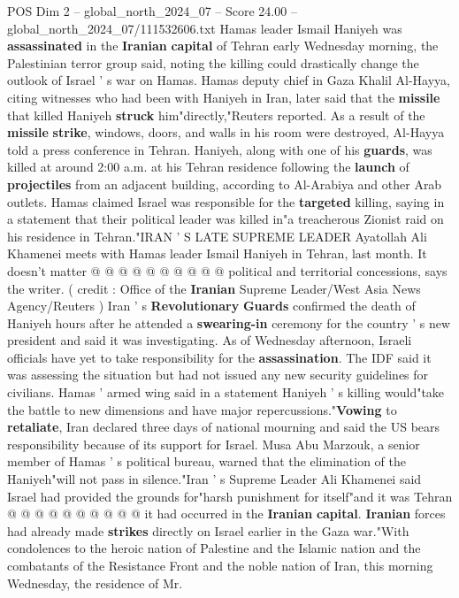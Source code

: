 \begin{textsample}{POS Dim 2 – global\_north\_2024\_07 – Score 24.00 – global\_north\_2024\_07/111532606.txt}  \label{ex:f2_pos_187}
Hamas leader Ismail Haniyeh was \textbf{assassinated} in the \textbf{Iranian} \textbf{capital} of Tehran early Wednesday morning, the Palestinian terror group said, noting the killing could drastically change the outlook of Israel ' s war on Hamas.
Hamas deputy chief in Gaza Khalil Al-Hayya, citing witnesses who had been with Haniyeh in Iran, later said that the \textbf{missile} that killed Haniyeh \textbf{struck} him"directly,"Reuters reported.
As a result of the \textbf{missile} \textbf{strike}, windows, doors, and walls in his room were destroyed, Al-Hayya told a press conference in Tehran.
Haniyeh, along with one of his \textbf{guards}, was killed at around 2:00 a.m. at his Tehran residence following the \textbf{launch} of \textbf{projectiles} from an adjacent building, according to Al-Arabiya and other Arab outlets.
Hamas claimed Israel was responsible for the \textbf{targeted} killing, saying in a statement that their political leader was killed in"a treacherous Zionist raid on his residence in Tehran."IRAN ' S LATE SUPREME LEADER Ayatollah Ali Khamenei meets with Hamas leader Ismail Haniyeh in Tehran, last month.
It doesn't matter @ @ @ @ @ @ @ @ @ @ political and territorial concessions, says the writer. ( credit : Office of the \textbf{Iranian} Supreme Leader/West Asia News Agency/Reuters ) Iran ' s \textbf{Revolutionary} \textbf{Guards} confirmed the death of Haniyeh hours after he attended a \textbf{swearing-in} ceremony for the country ' s new president and said it was investigating.
As of Wednesday afternoon, Israeli officials have yet to take responsibility for the \textbf{assassination}.
The IDF said it was assessing the situation but had not issued any new security guidelines for civilians.
Hamas ' armed wing said in a statement Haniyeh ' s killing would"take the battle to new dimensions and have major repercussions."\textbf{Vowing} to \textbf{retaliate}, Iran declared three days of national mourning and said the US bears responsibility because of its support for Israel.
Musa Abu Marzouk, a senior member of Hamas ' s political bureau, warned that the elimination of the Haniyeh"will not pass in silence."Iran ' s Supreme Leader Ali Khamenei said Israel had provided the grounds for"harsh punishment for itself"and it was Tehran @ @ @ @ @ @ @ @ @ @ it had occurred in the \textbf{Iranian} \textbf{capital}. \textbf{Iranian} forces had already made \textbf{strikes} directly on Israel earlier in the Gaza war."With condolences to the heroic nation of Palestine and the Islamic nation and the combatants of the Resistance Front and the noble nation of Iran, this morning Wednesday, the residence of Mr.

\end{textsample}
